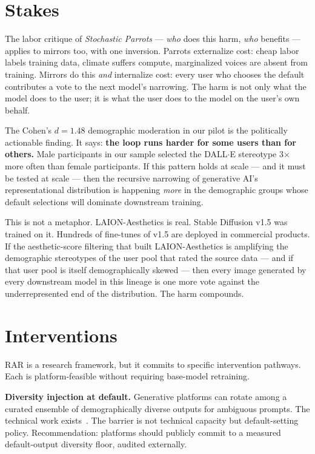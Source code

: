 \documentclass[sigconf,nonacm]{acmart}
\begin{document}
\section{Stakes}

The labor critique of \emph{Stochastic Parrots} --- \emph{who} does this harm, \emph{who} benefits --- applies to mirrors too, with one inversion. Parrots externalize cost: cheap labor labels training data, climate suffers compute, marginalized voices are absent from training. Mirrors do this \emph{and} internalize cost: every user who chooses the default contributes a vote to the next model's narrowing. The harm is not only what the model does to the user; it is what the user does to the model on the user's own behalf.

The Cohen's \(d = 1.48\) demographic moderation in our pilot is the politically actionable finding. It says: \textbf{the loop runs harder for some users than for others.} Male participants in our sample selected the DALL$\cdot$E stereotype 3$\times$ more often than female participants. If this pattern holds at scale --- and it must be tested at scale --- then the recursive narrowing of generative AI's representational distribution is happening \emph{more} in the demographic groups whose default selections will dominate downstream training.

This is not a metaphor. LAION-Aesthetics is real. Stable Diffusion v1.5 was trained on it. Hundreds of fine-tunes of v1.5 are deployed in commercial products. If the aesthetic-score filtering that built LAION-Aesthetics is amplifying the demographic stereotypes of the user pool that rated the source data --- and if that user pool is itself demographically skewed --- then every image generated by every downstream model in this lineage is one more vote against the underrepresented end of the distribution. The harm compounds.

\section{Interventions}

RAR is a research framework, but it commits to specific intervention pathways. Each is platform-feasible without requiring base-model retraining.

\textbf{Diversity injection at default.} Generative platforms can rotate among a curated ensemble of demographically diverse outputs for ambiguous prompts. The technical work exists~\cite{friedrich2023fair, naik2023social}. The barrier is not technical capacity but default-setting policy. Recommendation: platforms should publicly commit to a measured default-output diversity floor, audited externally.
\end{document}
